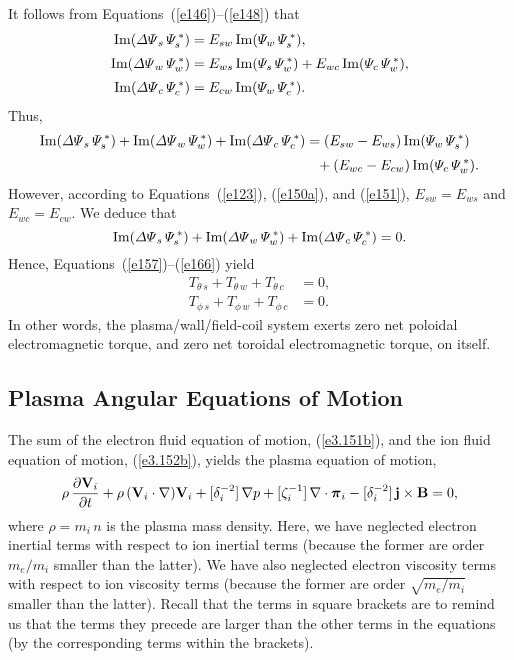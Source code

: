 \documentclass[notitlepage,12pt]{article}
\newcommand{\bpi}{\mbox{\boldmath$\pi$}}
\begin{document}
{It follows from Equations~(\ref{e146})--(\ref{e148}) that
\begin{align}
{\rm Im}({\mit\Delta\Psi}_s\,{\mit\Psi}_s^{\,\ast}) &= E_{sw}\,{\rm Im}({\mit\Psi}_w\,{\mit\Psi}_s^{\,\ast}),\\[0.5ex]
{\rm Im}({\mit\Delta\Psi}_w\,{\mit\Psi}_w^{\,\ast}) &= E_{ws}\,{\rm Im}({\mit\Psi}_s\,{\mit\Psi}_w^{\,\ast})+E_{wc}\,{\rm Im}({\mit\Psi}_c\,{\mit\Psi}_w^{\,\ast}),\\[0.5ex]
 {\rm Im}({\mit\Delta\Psi}_c\,{\mit\Psi}_c^{\,\ast}) &=E_{cw}\,{\rm Im}({\mit\Psi}_w\,{\mit\Psi}_c^{\,\ast}).
 \end{align}
 Thus,
 \begin{align}
 {\rm Im}({\mit\Delta\Psi}_s\,{\mit\Psi}_s^{\,\ast})+ {\rm Im}({\mit\Delta\Psi}_w\,{\mit\Psi}_w^{\,\ast}) + {\rm Im}({\mit\Delta\Psi}_c\,{\mit\Psi}_c^{\,\ast}) & = (E_{sw}-E_{ws})\,{\rm Im}({\mit\Psi}_w\,{\mit\Psi}_s^{\,\ast}) \nonumber\\[0.5ex]
 &\phantom{=}+ (E_{wc}-E_{cw})\,{\rm Im}({\mit\Psi}_c\,{\mit\Psi}_w^{\,\ast}).
 \end{align}
 However, according to Equations~(\ref{e123}), (\ref{e150a}), and (\ref{e151}), $E_{sw}=E_{ws}$ and $E_{wc}=E_{cw}$. 
We deduce that
 \begin{equation} 
  {\rm Im}({\mit\Delta\Psi}_s\,{\mit\Psi}_s^{\,\ast})+ {\rm Im}({\mit\Delta\Psi}_w\,{\mit\Psi}_w^{\,\ast}) + {\rm Im}({\mit\Delta\Psi}_c\,{\mit\Psi}_c^{\,\ast})=0.
  \end{equation}
Hence, Equations~(\ref{e157})--(\ref{e166})   yield
\begin{align}
T_{\theta\,s} + T_{\theta\,w}+T_{\theta\,c} &= 0,\\[0.5ex]
T_{\phi\,s} + T_{\phi\,w}+T_{\phi\,c} &= 0.
\end{align}
In other words, the plasma/wall/field-coil system exerts zero net poloidal electromagnetic torque, and zero net toroidal electromagnetic
torque, on itself. 

\subsection{Plasma Angular Equations of Motion}
The sum of the electron fluid equation of motion, (\ref{e3.151b}), and the ion fluid equation of motion, (\ref{e3.152b}), yields the plasma equation of motion, 
\begin{equation}
\rho\,\frac{\partial  {\bf V}_i}{\partial t} +
\rho\,({\bf V}_i\cdot\nabla) {\bf V}_i +
 [\delta_i^{-2}]\,\nabla p + 
[\zeta_i^{-1}]\,\nabla\cdot \bpi_i-[\delta_i^{-2}]\,{\bf j}\times {\bf B} =0,\label{e175}
\end{equation}
where $\rho=m_i\,n$ is the plasma mass density.
Here, we have neglected electron inertial terms with respect to ion inertial terms (because the
former are order $m_e/m_i$ smaller than the latter). We have also neglected electron viscosity terms
with respect to ion viscosity terms (because the
former are order $\sqrt{m_e/m_i}$ smaller than the latter). Recall that the terms in square brackets are to remind us that the terms they precede are larger than the
other terms in the equations (by the corresponding terms within the brackets). 

}
\end{document}

